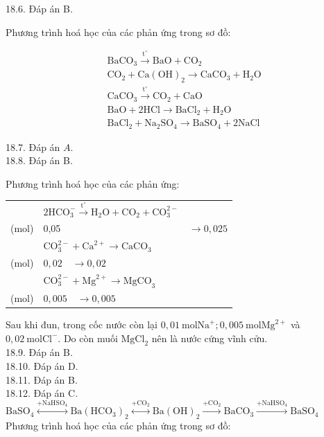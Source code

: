 \documentclass[10pt]{article}
\begin{document}
18.6. Đáp án B.

Phương trình hoá học của các phản ứng trong sơ đồ:

$$
\begin{aligned}
& \mathrm{BaCO}_{3} \xrightarrow{\mathrm{t}^{\circ}} \mathrm{BaO}+\mathrm{CO}_{2} \\
& \mathrm{CO}_{2}+\mathrm{Ca}(\mathrm{OH})_{2} \rightarrow \mathrm{CaCO}_{3}+\mathrm{H}_{2} \mathrm{O} \\
& \mathrm{CaCO}_{3} \xrightarrow{\mathrm{t}^{\circ}} \mathrm{CO}_{2}+\mathrm{CaO} \\
& \mathrm{BaO}+2 \mathrm{HCl} \rightarrow \mathrm{BaCl}_{2}+\mathrm{H}_{2} \mathrm{O} \\
& \mathrm{BaCl}_{2}+\mathrm{Na}_{2} \mathrm{SO}_{4} \rightarrow \mathrm{BaSO}_{4}+2 \mathrm{NaCl}
\end{aligned}
$$

18.7. Đáp án $A$.\\
18.8. Đáp án B.

Phương trình hoá học của các phản ứng:

\begin{center}
\begin{tabular}{lll}
 & $2 \mathrm{HCO}_{3}^{-} \xrightarrow{\mathrm{t}^{\circ}} \mathrm{H}_{2} \mathrm{O}+\mathrm{CO}_{2}+\mathrm{CO}_{3}^{2-}$ &  \\
(mol) & 0,05 & $\rightarrow 0,025$ \\
 & $\mathrm{CO}_{3}^{2-}+\mathrm{Ca}^{2+} \rightarrow \mathrm{CaCO}_{3}$ &  \\
(mol) & $0,02 \quad \rightarrow 0,02$ &  \\
 & $\mathrm{CO}_{3}^{2-}+\mathrm{Mg}^{2+} \rightarrow \mathrm{MgCO}_{3}$ &  \\
(mol) & $0,005 \quad \rightarrow 0,005$ &  \\
\end{tabular}
\end{center}

Sau khi đun, trong cốc nước còn lại $0,01 \mathrm{~mol} \mathrm{Na}^{+} ; 0,005 \mathrm{~mol} \mathrm{Mg}^{2+}$ và $0,02 \mathrm{~mol} \mathrm{Cl}^{-}$. Do còn muối $\mathrm{MgCl}_{2}$ nên là nước cứng vĩnh cửu.\\
18.9. Đáp án B.\\
18.10. Đáp án D.\\
18.11. Đáp án B.\\
18.12. Đáp án C.\\
$\mathrm{BaSO}_{4} \stackrel{+\mathrm{NaHSO}_{4}}{\longleftrightarrow} \mathrm{Ba}\left(\mathrm{HCO}_{3}\right)_{2} \stackrel{+\mathrm{CO}_{2}}{\longleftrightarrow} \mathrm{Ba}(\mathrm{OH})_{2} \xrightarrow{+\mathrm{CO}_{2}} \mathrm{BaCO}_{3} \xrightarrow{+\mathrm{NaHSO}_{4}} \mathrm{BaSO}_{4}$\\
Phương trình hoá học của các phản ứng trong sơ đồ:
\end{document}
